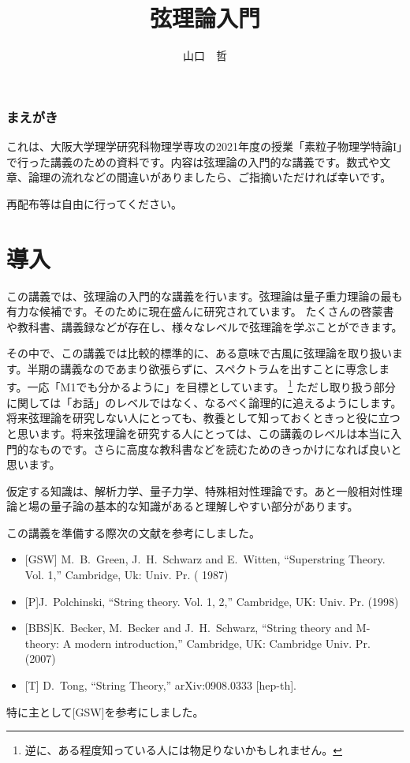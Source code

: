 \documentclass[report,paper=a4, fontsize=12pt, line_length=16cm, number_of_lines=34,dvipdfmx]{jlreq}
\numberwithin{equation}{chapter}
\numberwithin{equation}{section}
\begin{document}
\title{弦理論入門}
\author{山口　哲}
\maketitle
\tableofcontents
\subsection*{まえがき}
これは、大阪大学理学研究科物理学専攻の2021年度の授業「素粒子物理学特論I」で行った講義のための資料です。内容は弦理論の入門的な講義です。数式や文章、論理の流れなどの間違いがありましたら、ご指摘いただければ幸いです。

再配布等は自由に行ってください。

\chapter{導入}
この講義では、弦理論の入門的な講義を行います。弦理論は量子重力理論の最も有力な候補です。そのために現在盛んに研究されています。
たくさんの啓蒙書や教科書、講義録などが存在し、様々なレベルで弦理論を学ぶことができます。

その中で、この講義では比較的標準的に、ある意味で古風に弦理論を取り扱います。半期の講義なのであまり欲張らずに、スペクトラムを出すことに専念します。一応「M1でも分かるように」を目標としています。
\footnote{逆に、ある程度知っている人には物足りないかもしれません。}
ただし取り扱う部分に関しては「お話」のレベルではなく、なるべく論理的に追えるようにします。将来弦理論を研究しない人にとっても、教養として知っておくときっと役に立つと思います。将来弦理論を研究する人にとっては、この講義のレベルは本当に入門的なものです。さらに高度な教科書などを読むためのきっかけになれば良いと思います。

仮定する知識は、解析力学、量子力学、特殊相対性理論です。あと一般相対性理論と場の量子論の基本的な知識があると理解しやすい部分があります。

この講義を準備する際次の文献を参考にしました。
\begin{itemize}
 \item {} [GSW] M.~B.~Green, J.~H.~Schwarz and E.~Witten,
  ``Superstring Theory. Vol. 1,''
  Cambridge, Uk: Univ. Pr. ( 1987) 
\item {}[P]J.~Polchinski,
  ``String theory. Vol. 1, 2,''
  Cambridge, UK: Univ. Pr. (1998)
 \item {}[BBS]K.~Becker, M.~Becker and J.~H.~Schwarz,
  ``String theory and M-theory: A modern introduction,''
  Cambridge, UK: Cambridge Univ. Pr. (2007)
\item {}[T] D.~Tong,
  ``String Theory,''
  arXiv:0908.0333 [hep-th].
\end{itemize}
特に主として[GSW]を参考にしました。
\end{document}
